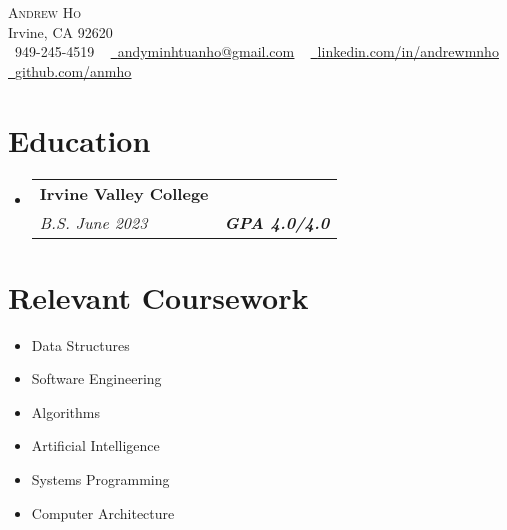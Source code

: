 \documentclass[letterpaper,11pt]{article}
\makeatletter
\newcommand{\resumeSubheading}[4]{
  \vspace{-2pt}\item
    \begin{tabular*}{1.0\textwidth}[t]{l@{\extracolsep{\fill}}r}
      \textbf{#1} & \textbf{\small #2} \\
      \textit{\small#3} & \textit{\small #4} \\
    \end{tabular*}\vspace{-7pt}
}
\newcommand{\resumeSubHeadingListStart}{\begin{itemize}[leftmargin=0.0in, label={}]}
\newcommand{\resumeSubHeadingListEnd}{\end{itemize}}
\makeatother
\begin{document}

\begin{center}
    {\Huge \scshape Andrew Ho} \\ \vspace{1pt}
    Irvine, CA 92620 \\ \vspace{1pt}
    \small \raisebox{-0.1\height}\faPhone\ 949-245-4519 ~ \href{mailto:x@gmail.com}{\raisebox{-0.2\height}\faEnvelope\  \underline{andyminhtuanho@gmail.com}} ~
    \href{https://linkedin.com/in/andrewmnho/}{\raisebox{-0.2\height}\faLinkedin\ \underline{linkedin.com/in/andrewmnho}}  ~
    \href{https://github.com/}{\raisebox{-0.2\height}\faGithub\ \underline{github.com/anmho}}
    \vspace{-8pt}
\end{center}


\section{Education}
\resumeSubHeadingListStart
\resumeSubheading
{Irvine Valley College \normalfont{\small{-- Irvine, CA}}}{\normalfont{Computer Science}}
{B.S. June 2023}{\textbf{GPA 4.0/4.0}}
\resumeSubHeadingListEnd

\section{Relevant Coursework}
\begin{multicols}{4}
    \begin{itemize}[itemsep=-5pt, parsep=3pt]
        \item\small Data Structures
        \item Software Engineering
        \item Algorithms
        \item Artificial Intelligence
        \item Systems Programming
        \item Computer Architecture
    \end{itemize}
\end{multicols}
\vspace*{2.0\multicolsep}
\end{document}
